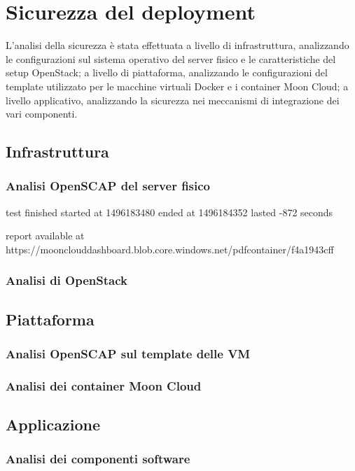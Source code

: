 \documentclass[../main.tex]{subfiles}
\begin{document}
\section{Sicurezza del deployment}
L'analisi della sicurezza è stata effettuata a livello di infrastruttura, analizzando le configurazioni sul sistema operativo del server fisico e le caratteristiche del setup OpenStack; a livello di piattaforma, analizzando le configurazioni del template utilizzato per le macchine virtuali Docker e i container Moon Cloud; a livello applicativo, analizzando la sicurezza nei meccanismi di integrazione dei vari componenti.
\subsection{Infrastruttura}
\subsubsection{Analisi OpenSCAP del server fisico}

test finished
started at 1496183480
ended at 1496184352
lasted -872 seconds

report available at
https://moonclouddashboard.blob.core.windows.net/pdfcontainer/f4a1943cff

\subsubsection{Analisi di OpenStack}

\subsection{Piattaforma}
\subsubsection{Analisi OpenSCAP sul template delle VM}
\subsubsection{Analisi dei container Moon Cloud}

\subsection{Applicazione}
\subsubsection{Analisi dei componenti software}
\end{document}
